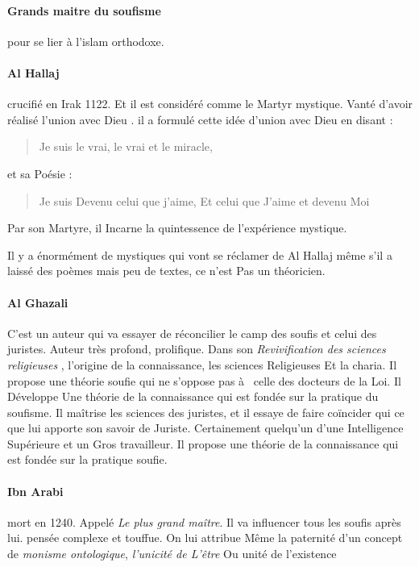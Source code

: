 \paragraph{Grands maitre du soufisme}pour se lier à l'islam orthodoxe.
\paragraph{Al Hallaj} crucifié en Irak 1122. Et il est considéré comme 
le 
Martyr mystique.
Vanté d'avoir réalisé l'union avec Dieu   . il a formulé cette idée d'union avec Dieu en disant :
\begin{quote}
    Je suis le vrai, le vrai et le miracle, 
\end{quote}
et sa Poésie : 
 \begin{quote}
    Je suis 
Devenu celui que j'aime, 
Et celui que 
J'aime et devenu  Moi 
\end{quote}
 Par son 
Martyre, il 
Incarne la quintessence de 
l'expérience mystique.  
  
Il y a 
énormément 
de mystiques qui vont se réclamer de Al Hallaj même s'il a laissé des poèmes mais peu 
de textes, ce n'est 
Pas un théoricien.
\paragraph{Al Ghazali} 
C'est un auteur 
qui  va essayer de réconcilier le camp des soufis et celui des juristes. Auteur très profond, prolifique. Dans son \textit{Revivification des sciences religieuses 
},  l'origine de la connaissance, les sciences 
Religieuses 
Et la charia.  Il propose une théorie soufie qui  ne s'oppose pas à  celle des docteurs de la Loi. Il 
Développe 
Une théorie de la connaissance qui  est fondée sur la 
pratique du soufisme. 
Il maîtrise les sciences des juristes, et il essaye 
de faire coïncider qui  ce que lui apporte son savoir de 
Juriste. Certainement quelqu'un d'une 
Intelligence 
Supérieure et un 
Gros travailleur. Il propose une théorie 
de la connaissance 
qui  est fondée sur la pratique soufie.

\paragraph{Ibn Arabi}
 mort 
en 1240. 
Appelé \textit{Le plus grand maître}. 
Il va influencer 
tous les soufis après lui. 
  pensée 
complexe et touffue. 
 On lui attribue 
Même la paternité d'un concept de \textit{monisme ontologique}, \textit{l'unicité de 
L'être 
} Ou unité de l'existence 
 
